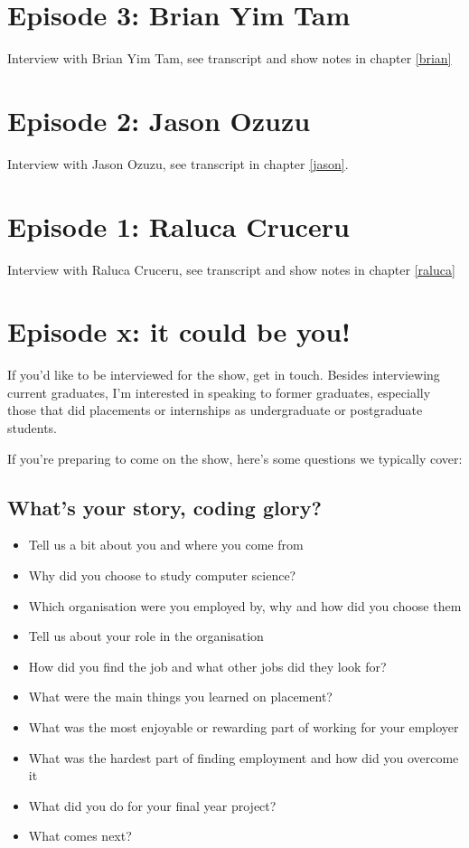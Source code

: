 \documentclass[
]{book}
\providecommand{\tightlist}{%
  \setlength{\itemsep}{0pt}\setlength{\parskip}{0pt}}
\begin{document}
\hypertarget{ep3}{%
\section{Episode 3: Brian Yim Tam}\label{ep3}}

Interview with Brian Yim Tam, see transcript and show notes in chapter \ref{brian}

\hypertarget{ep2}{%
\section{Episode 2: Jason Ozuzu}\label{ep2}}

Interview with Jason Ozuzu, see transcript in chapter \ref{jason}.

\hypertarget{ep1}{%
\section{Episode 1: Raluca Cruceru}\label{ep1}}

Interview with Raluca Cruceru, see transcript and show notes in chapter \ref{raluca}

\hypertarget{you}{%
\section{Episode x: it could be you!}\label{you}}

If you'd like to be interviewed for the show, get in touch. Besides interviewing current graduates, I'm interested in speaking to former graduates, especially those that did placements or internships as undergraduate or postgraduate students.

If you're preparing to come on the show, here's some questions we typically cover:

\hypertarget{wyscg}{%
\subsection{What's your story, coding glory?}\label{wyscg}}

\begin{itemize}
\tightlist
\item
  Tell us a bit about you and where you come from
\item
  Why did you choose to study computer science?
\item
  Which organisation were you employed by, why and how did you choose them
\item
  Tell us about your role in the organisation
\item
  How did you find the job and what other jobs did they look for?
\item
  What were the main things you learned on placement?
\item
  What was the most enjoyable or rewarding part of working for your employer
\item
  What was the hardest part of finding employment and how did you overcome it
\item
  What did you do for your final year project?
\item
  What comes next?
\end{itemize}
\end{document}
